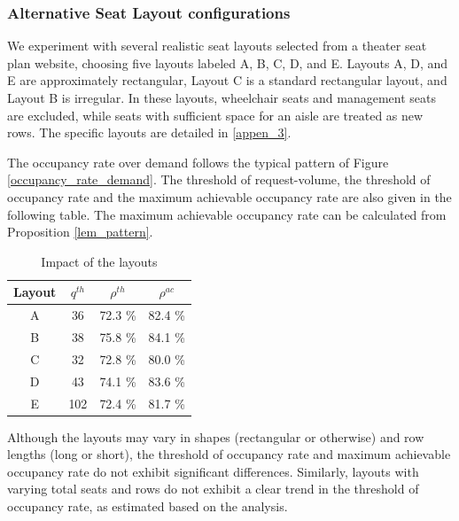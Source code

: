 \subsubsection{Alternative Seat Layout configurations}
We experiment with several realistic seat layouts selected from a theater seat plan website, choosing five layouts labeled A, B, C, D, and E. Layouts A, D, and E are approximately rectangular, Layout C is a standard rectangular layout, and Layout B is irregular. In these layouts, wheelchair seats and management seats are excluded, while seats with sufficient space for an aisle are treated as new rows. The specific layouts are detailed in \ref{appen_3}.

The occupancy rate over demand follows the typical pattern of Figure \ref{occupancy_rate_demand}. The threshold of request-volume, the threshold of occupancy rate and the maximum achievable occupancy rate are also given in the following table. The maximum achievable occupancy rate can be calculated from Proposition \ref{lem_pattern}.

\begin{table}[ht]
  \centering
  \caption{Impact of the layouts}
  \begin{tabular}{cccc}
  \hline
  \hline
   Layout & $q^{th}$ & $\rho^{th}$ & $\rho^{ac}$ \\
  \hline
   A & 36 & 72.3 \% & 82.4 \% \\
   B & 38 & 75.8 \% & 84.1 \% \\
   C & 32 & 72.8 \% & 80.0 \% \\
   D & 43 & 74.1 \%  & 83.6 \% \\
   E & 102 & 72.4 \% & 81.7 \% \\
   \hline
   \hline
  \end{tabular}
\end{table}

Although the layouts may vary in shapes (rectangular or otherwise) and row lengths (long or short), the threshold of occupancy rate and maximum achievable occupancy rate do not exhibit significant differences. Similarly, layouts with varying total seats and rows do not exhibit a clear trend in the threshold of occupancy rate, as estimated based on the analysis.